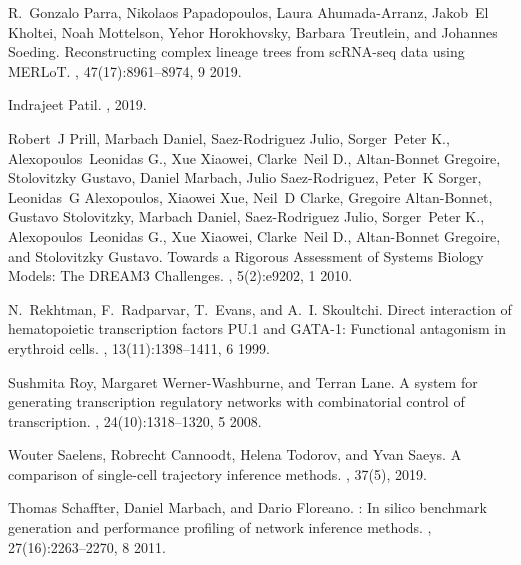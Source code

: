 \documentclass[10pt, a4paper]{article}
\begin{document}
\begin{thebibliography}{10}
	R.~Gonzalo Parra, Nikolaos Papadopoulos, Laura Ahumada-Arranz, Jakob~El
	Kholtei, Noah Mottelson, Yehor Horokhovsky, Barbara Treutlein, and Johannes
	Soeding.
	\newblock Reconstructing complex lineage trees from {{scRNA}}-seq data using
	{{MERLoT}}.
	, 47(17):8961--8974, 9 2019.
	
	Indrajeet Patil.
	, 2019.
	
	Robert~J Prill, Marbach Daniel, Saez-Rodriguez Julio, Sorger~Peter K.,
	Alexopoulos~Leonidas G., Xue Xiaowei, Clarke~Neil D., Altan-Bonnet Gregoire,
	Stolovitzky Gustavo, Daniel Marbach, Julio Saez-Rodriguez, Peter~K Sorger,
	Leonidas~G Alexopoulos, Xiaowei Xue, Neil~D Clarke, Gregoire Altan-Bonnet,
	Gustavo Stolovitzky, Marbach Daniel, Saez-Rodriguez Julio, Sorger~Peter K.,
	Alexopoulos~Leonidas G., Xue Xiaowei, Clarke~Neil D., Altan-Bonnet Gregoire,
	and Stolovitzky Gustavo.
	\newblock Towards a {{Rigorous Assessment}} of {{Systems Biology Models}}:
	{{The DREAM3 Challenges}}.
	, 5(2):e9202, 1 2010.
	
	N.~Rekhtman, F.~Radparvar, T.~Evans, and A.~I. Skoultchi.
	\newblock Direct interaction of hematopoietic transcription factors {{PU}}.1
	and {{GATA}}-1: Functional antagonism in erythroid cells.
	, 13(11):1398--1411, 6 1999.
	
	Sushmita Roy, Margaret Werner-Washburne, and Terran Lane.
	\newblock A system for generating transcription regulatory networks with
	combinatorial control of transcription.
	, 24(10):1318--1320, 5 2008.
	
	Wouter Saelens, Robrecht Cannoodt, Helena Todorov, and Yvan Saeys.
	\newblock A comparison of single-cell trajectory inference methods.
	, 37(5), 2019.
	
	Thomas Schaffter, Daniel Marbach, and Dario Floreano.
	: In silico benchmark generation and performance
	profiling of network inference methods.
	, 27(16):2263--2270, 8 2011.
	

\end{thebibliography}
\end{document}
